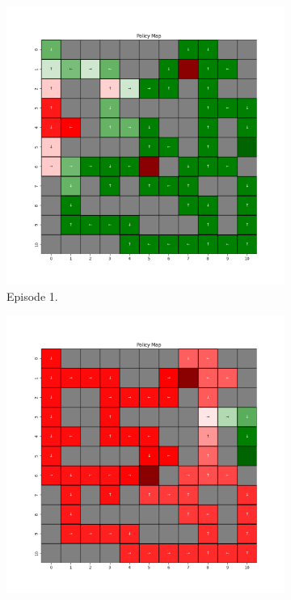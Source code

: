 \documentclass{assignment}
\begin{document}
\begin{figure}[H]
    \begin{subfigure}{0.3\textwidth}
        \includegraphics[width=\textwidth]{figures/policy_q/epsilon_sweep/policy_alpha_0.1_gamma_0.95_epsilon_0.0_iteration_1.png}
    \caption{Episode 1.}
    \end{subfigure}\hfill
    \begin{subfigure}{0.3\textwidth}
        \includegraphics[width=\textwidth]{figures/policy_q/epsilon_sweep/policy_alpha_0.1_gamma_0.95_epsilon_0.0_iteration_50.png}

\end{subfigure}
\end{figure}
\end{document}
